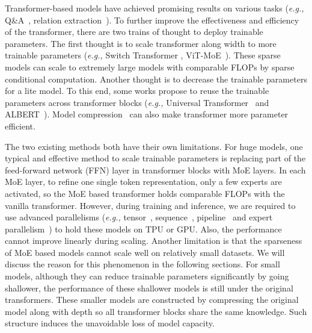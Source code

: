 \documentclass[letterpaper]{article} %
\newcommand{\eg}{\emph{e.g.,}\xspace}
\begin{document}
\noindent Transformer-based models have achieved promising results on various tasks (\eg Q\&A~\cite{qu2019bert,yang2020bert}, relation extraction~\cite{xue2020gdpnet,xue2020embarrassingly,zhou2020document}). To further improve the effectiveness and efficiency of the transformer, there are two trains of thought to deploy trainable parameters. The first thought is to scale transformer along width to more trainable parameters (\eg Switch Transformer \cite{fedus2021switch}, ViT-MoE~\cite{riquelme2021scaling}). These sparse models can scale to extremely large models with comparable FLOPs by sparse conditional computation. Another thought is to decrease the trainable parameters for a lite model. To this end, some works propose to reuse the trainable parameters across transformer blocks (\eg Universal Transformer~\cite{dehghani2018universal} and ALBERT~\cite{lan2019albert}). Model compression~\cite{xu-etal-2020-bert,sun-etal-2019-patient} can also make transformer more parameter efficient. 








The two existing methods both have their own limitations. For huge models, one typical and effective method to scale trainable parameters is replacing part of the feed-forward network (FFN) layer in transformer blocks with MoE layers. In each MoE layer, to refine one single token representation, only a few experts are activated, so the MoE based transformer holds comparable FLOPs with the vanilla transformer. However, during training and inference, we are required to use advanced parallelisms (\eg tensor~\cite{shoeybi2019megatron}, sequence~\cite{li2021sequence}, pipeline~\cite{huang2018gpipe} and expert parallelism~\cite{lepikhin2020gshard}) to hold these models on TPU or GPU. Also, the performance cannot improve linearly during scaling. Another limitation is that the sparseness of MoE based models cannot scale well on relatively small datasets. We will discuss the reason for this phenomenon in the following sections. For small models, although they can reduce trainable parameters significantly by going shallower, the performance of these shallower models is still under the original transformers. These smaller models are constructed by compressing the original model along with depth so all transformer blocks share the same knowledge. Such structure induces the unavoidable loss of model capacity.
\end{document}
